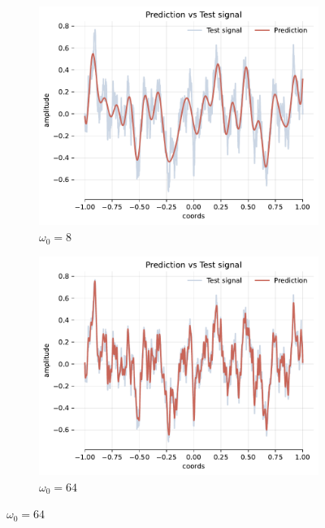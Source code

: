 \begin{figure}[h]
    \centering
    \begin{subfigure}[b]{0.32\textwidth}
        \centering
        \includegraphics[width=\textwidth]{img/ch3/pred-noise-h0-w8.pdf}
        \caption{$\omega_0=8$}
        \label{fig:rec-noise-shallow-w8}
    \end{subfigure}
    \hfill
    \begin{subfigure}[b]{0.32\textwidth}
        \centering
        \includegraphics[width=\textwidth]{img/ch3/pred-noise-h0-w64.pdf}
        \caption{$\omega_0=64$}
        \label{fig:rec-noise-shallow-w64}
    \end{subfigure}

\end{figure}
